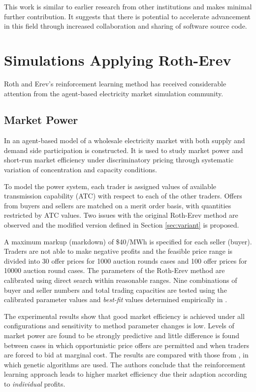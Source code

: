 This work is similar to earlier research from other institutions and makes
minimal further contribution.  It suggests that there is potential to accelerate
advancement in this field through increased collaboration and sharing of
software source code.

\section{Simulations Applying Roth-Erev}
Roth and Erev's reinforcement learning method has received considerable
attention from the agent-based electricity market simulation community.

\subsection{Market Power}
In  an agent-based model of a wholesale electricity market
with both supply and demand side participation is constructed.  It is used to
study market power and short-run market efficiency under discriminatory pricing
through systematic variation of concentration and capacity conditions.

To model the power system, each trader is assigned values of available
transmission capability (ATC) with respect to each of the other traders.
Offers from buyers and sellers are matched on a merit order basis, with quantities restricted by
ATC values.  Two issues with the original Roth-Erev method are observed and
the modified version defined in Section \ref{sec:variant} is proposed.

A maximum markup (markdown) of \$40/MWh is specified for each seller (buyer).
Traders are not able to make negative profits and the feasible price range
is divided into 30 offer prices for 1000 auction rounds cases and 100 offer
prices for 10000 auction round cases.  The parameters of the Roth-Erev method
are calibrated using direct search within reasonable ranges.  Nine combinations of
buyer and seller numbers and total trading capacities are tested using the
calibrated parameter values and \textit{best-fit} values determined
empirically in .

The experimental results show that good market efficiency is achieved under all
configurations and sensitivity to method parameter changes is low.  Levels of
market power are found to be strongly predictive and little difference is found
between cases in which opportunistic price offers are permitted and when traders
are forced to bid at marginal cost.  The results are compared with those from
, in which genetic algorithms are used.  The authors
conclude that the reinforcement learning approach leads to higher market
efficiency due their adaption according to \textit{individual} profits.

